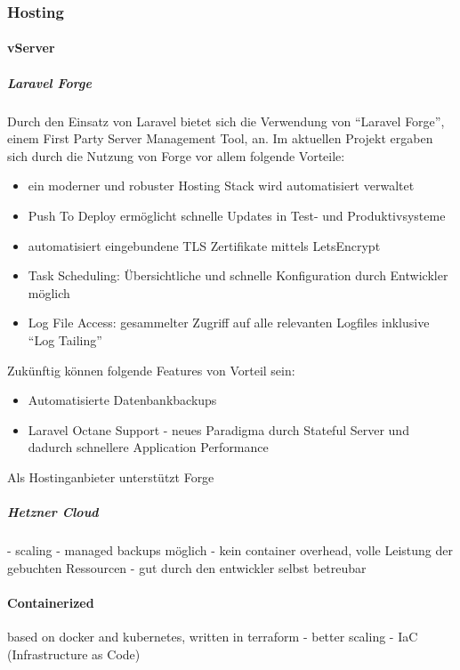 \subsubsection{Hosting}

\paragraph{vServer}

\subparagraph{Laravel Forge}
Durch den Einsatz von Laravel bietet sich die Verwendung von \enquote{Laravel Forge}\cite{laravel-forge}, einem First Party Server Management Tool, an.
Im aktuellen Projekt ergaben sich durch die Nutzung von Forge vor allem folgende Vorteile:
\begin{itemize}
    \item ein moderner und robuster Hosting Stack wird automatisiert verwaltet
    \item Push To Deploy ermöglicht schnelle Updates in Test- und Produktivsysteme
    \item automatisiert eingebundene TLS Zertifikate mittels LetsEncrypt
    \item Task Scheduling: Übersichtliche und schnelle Konfiguration durch Entwickler möglich
    \item Log File Access: gesammelter Zugriff auf alle relevanten Logfiles inklusive \enquote{Log Tailing}
\end{itemize}

Zukünftig können folgende Features von Vorteil sein:
\begin{itemize}
    \item Automatisierte Datenbankbackups
    \item Laravel Octane Support - neues Paradigma durch Stateful Server und dadurch schnellere Application Performance\cite{laravel-octane}
\end{itemize}

Als Hostinganbieter unterstützt Forge

\subparagraph{Hetzner Cloud}
- scaling
- managed backups möglich
- kein container overhead, volle Leistung der gebuchten Ressourcen
- gut durch den entwickler selbst betreubar

\paragraph{Containerized}
based on docker and kubernetes, written in terraform
- better scaling
- IaC (Infrastructure as Code)
